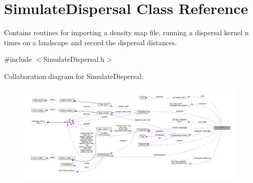 \hypertarget{class_simulate_dispersal}{}\section{Simulate\+Dispersal Class Reference}
\label{class_simulate_dispersal}


Contains routines for importing a density map file, running a dispersal kernel n times on a landscape and record the dispersal distances.  




{\ttfamily \#include $<$Simulate\+Dispersal.\+h$>$}



Collaboration diagram for Simulate\+Dispersal\+:
\nopagebreak
\begin{figure}[H]
\begin{center}
\leavevmode
\includegraphics[width=350pt]{class_simulate_dispersal__coll__graph}
\end{center}
\end{figure}
